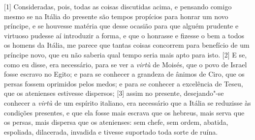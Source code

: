 

{[}1{]} Consideradas, pois, todas as coisas discutidas acima, e pensando
comigo mesmo se na Itália do presente são tempos propícios para honrar
um novo príncipe, e se houvesse matéria que desse ocasião para que
alguém prudente e virtuoso pudesse aí introduzir a forma, e que o honrasse e
fizesse o bem a todos os homens da Itália, me parece que tantas coisas
concorrem para benefício de um príncipe novo, que eu não saberia qual
tempo seria mais apto para isto. {[}2{]} E se, como eu disse, era
necessário, para se ver a \emph{virtù} de Moisés, que o povo de Israel
fosse escravo no Egito; e para se conhecer a grandeza de ânimos de Ciro,
que os persas fossem oprimidos pelos medos; e para se conhecer a
excelência de Teseu, que os atenienses estivesse dispersos; {[}3{]}
assim no presente, desejando"-se conhecer a \emph{virtù} de um espírito
italiano, era necessário que a Itália se reduzisse às condições
presentes, e que ela fosse mais escrava que os hebreus, mais serva que
os persas, mais dispersa que os atenienses: sem chefe, sem ordem,
abatida, espoliada, dilacerada, invadida e tivesse suportado toda sorte
de ruína.

